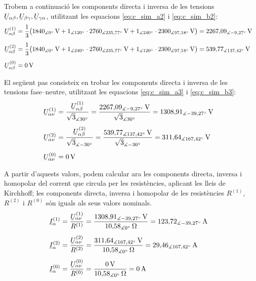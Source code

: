 \begin{exemple}
Trobem a continuaci\'{o} les components directa i inversa de les
tensions $\cmplx{U}_{\alpha\beta}, \cmplx{U}_{\beta\gamma},
\cmplx{U}_{\gamma\alpha}$, utilitzant les equacions
\eqref{eq:c_sim_a2} i \eqref{eq:c_sim_b2}:
\begin{align*}
\cmplx{U}_{\alpha\beta}\ap{(1)} &= \frac{1}{3} \big(
1840_{\measuredangle 0\degree}\unit{V} + 1_{\measuredangle
120\degree} \cdot 2760_{\measuredangle 235{,}77\degree}\unit{V} +
1_{\measuredangle 240\degree} \cdot 2300_{\measuredangle
97{,}18\degree}\unit{V} \big) = 2267{,}09_{\measuredangle -9{,}27\degree}\unit{V} \\[1ex]
\cmplx{U}_{\alpha\beta}\ap{(2)} &= \frac{1}{3} \big(
1840_{\measuredangle 0\degree}\unit{V} + 1_{\measuredangle
240\degree} \cdot 2760_{\measuredangle 235{,}77\degree}\unit{V} +
1_{\measuredangle 120\degree} \cdot 2300_{\measuredangle
97{,}18\degree}\unit{V} \big) = 539{,}77_{\measuredangle
137{,}42\degree}\unit{V} \\[1ex]
\cmplx{U}_{\alpha\beta}\ap{(0)} &= 0\unit{V}
\end{align*}

El seg\"{u}ent pas consisteix en trobar les components directa i inversa
de les tensions fase--neutre, utilitzant les equacions
\eqref{eq:c_sim_a3} i \eqref{eq:c_sim_b3}:
\begin{align*}
\cmplx{U}_{\alpha\nu}\ap{(1)} &=
\frac{\cmplx{U}_{\alpha\beta}\ap{(1)}}{\sqrt{3}_{\measuredangle
30\degree}} = \frac{2267{,}09_{\measuredangle
-9{,}27\degree}\unit{V}}{\sqrt{3}_{\measuredangle
30\degree}} = 1308{,}91_{\measuredangle -39{,}27\degree}\unit{V} \\[1ex]
\cmplx{U}_{\alpha\nu}\ap{(2)} &=
\frac{\cmplx{U}_{\alpha\beta}\ap{(2)}}{\sqrt{3}_{\measuredangle
-30\degree}} = \frac{539{,}77_{\measuredangle
137{,}42\degree}\unit{V}}{\sqrt{3}_{\measuredangle -30\degree}} =
311{,}64_{\measuredangle 167{,}42\degree}\unit{V} \\[1ex]
\cmplx{U}_{\alpha\nu}\ap{(0)} &= 0\unit{V}
\end{align*}

A partir d'aquests valors, podem calcular ara les components
directa, inversa i homopolar del corrent que circula per les
resist\`{e}ncies, aplicant les lleis de Kirchhoff; les components
directa, inversa i homopolar de les resist\`{e}ncies $R^{(1)}$,
$R^{(2)}$ i $R^{(0)}$ s\'{o}n iguals als seus valors nominals.
\begin{align*}
\cmplx{I}_\alpha\ap{(1)} &=
\frac{\cmplx{U}_{\alpha\nu}\ap{(1)}}{R^{(1)}} =
\frac{1308{,}91_{\measuredangle
-39{,}27\degree}\unit{V}}{10{,}58_{\measuredangle 0 \degree}
\unit{\ohm}} =
123{,}72_{\measuredangle -39{,}27\degree}\unit{A} \\[1ex]
\cmplx{I}_\alpha\ap{(2)} &=
\frac{\cmplx{U}_{\alpha\nu}\ap{(2)}}{R^{(2)}} =
\frac{311{,}64_{\measuredangle
167{,}42\degree}\unit{V}}{10{,}58_{\measuredangle 0 \degree}
\unit{\ohm}} = 29{,}46_{\measuredangle 167{,}42\degree}\unit{A} \\[1ex]
\cmplx{I}_\alpha\ap{(0)} &=
\frac{\cmplx{U}_{\alpha\nu}\ap{(0)}}{R^{(0)}} =
\frac{0\unit{V}}{10{,}58_{\measuredangle 0 \degree}\unit{\ohm}} =
0\unit{A}
\end{align*}


\end{exemple}
